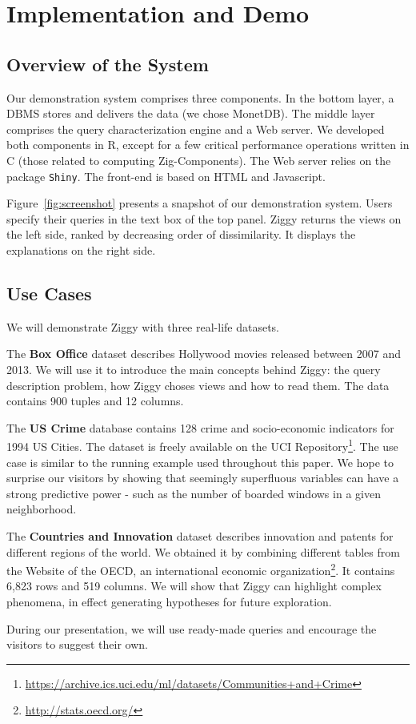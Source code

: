 \pagebreak



\section{Implementation and Demo}
\label{sec:demo}

\subsection{Overview of the System}
\label{sec:archi}
Our demonstration system comprises three components. In the bottom layer, a
DBMS stores and delivers the data (we chose MonetDB). The middle layer
comprises the query characterization engine and a Web server. We developed both
components in R, except for a few critical performance operations written in C (those
related to computing Zig-Components). The Web server relies on the package
\texttt{Shiny}. The front-end is based on HTML and Javascript. 

Figure~\ref{fig:screenshot} presents a snapshot of our demonstration system.
Users specify their queries in the text box of the top panel. Ziggy returns the
views on the left side, ranked by decreasing order of dissimilarity.  It
displays the explanations on the right side.

\subsection{Use Cases}
\label{sec:usecases}

We will demonstrate Ziggy with three real-life datasets.
\begin{itemize0}
    \item The \textbf{Box Office} dataset describes Hollywood movies released
        between 2007 and 2013. We will use it to introduce the main concepts behind
        Ziggy: the query description problem, how Ziggy choses views and how to
        read them. The data contains 900 tuples and 12 columns.
    \item The \textbf{US Crime} database contains 128 crime and socio-economic
        indicators for 1994 US Cities. The dataset is freely available on the
        UCI Repository\footnote{\url{https://archive.ics.uci.edu/ml/datasets/Communities+and+Crime}}.
        The use case is similar to the running example used throughout this
        paper. We hope to surprise our visitors by showing that seemingly
        superfluous variables can have a strong predictive power - such as the
        number of boarded windows in a given neighborhood.
    \item The \textbf{Countries and Innovation} dataset describes innovation
        and patents for different regions of the world. We obtained it by
        combining different tables from the Website of the OECD, an international
        economic organization\footnote{\url{http://stats.oecd.org/}}. It
        contains 6,823 rows and 519 columns. We will show that Ziggy can
        highlight complex phenomena, in effect generating hypotheses for future
        exploration.
\end{itemize0}
During our presentation, we will use ready-made queries and encourage the
visitors to suggest their own.

